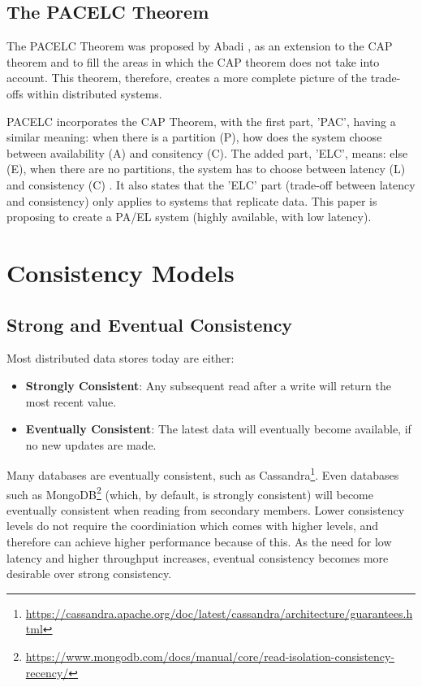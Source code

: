 \documentclass[12pt]{report}
\begin{document}
\subsection{The PACELC Theorem}
The PACELC Theorem was proposed by Abadi \cite{6127847}, as an extension to the CAP theorem and to fill the areas in which the CAP theorem does not take into account. This theorem, therefore, creates a more complete picture of the trade-offs within distributed systems. \par
PACELC incorporates the CAP Theorem, with the first part, 'PAC', having a similar meaning: when there is a partition (P), how does the system choose between availability (A) and consitency (C). The added part, 'ELC', means: else (E), when there are no partitions, the system has to choose between latency (L) and consistency (C) \cite{6127847}. It also states that the 'ELC' part (trade-off between latency and consistency) only applies to systems that replicate data. This paper is proposing to create a PA/EL \cite{6127847} system (highly available, with low latency).

\section{Consistency Models}
\subsection{Strong and Eventual Consistency}
Most distributed data stores today are either:
\begin{itemize}
    \item \textbf{Strongly Consistent}: Any subsequent read after a write will return the most recent value.
    \item \textbf{Eventually Consistent}: The latest data will eventually become available, if no new updates are made.
\end{itemize}
Many databases are eventually consistent, such as Cassandra\footnote{\url{https://cassandra.apache.org/doc/latest/cassandra/architecture/guarantees.html}}. Even databases such as MongoDB\footnote{\url{https://www.mongodb.com/docs/manual/core/read-isolation-consistency-recency/}} (which, by default, is strongly consistent) will become eventually consistent when reading from secondary members. Lower consistency levels do not require the coordiniation which comes with higher levels, and therefore can achieve higher performance because of this. As the need for low latency and higher throughput increases, eventual consistency becomes more desirable over strong consistency. \par
\end{document}
